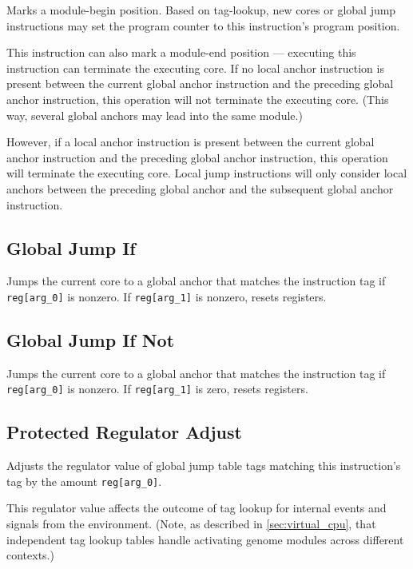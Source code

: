 
Marks a module-begin position.
Based on tag-lookup, new cores or global jump instructions may set the program counter to this instruction's program position.

This instruction can also mark a module-end position --- executing this instruction can terminate the executing core.
If no local anchor instruction is present between the current global anchor instruction and the preceding global anchor instruction, this operation will not terminate the executing core.
(This way, several global anchors may lead into the same module.)

However, if a local anchor instruction is present between the current global anchor instruction and the preceding global anchor instruction, this operation will terminate the executing core. 
Local jump instructions will only consider local anchors between the preceding global anchor and the subsequent global anchor instruction.

\subsection{Global Jump If}


Jumps the current core to a global anchor that matches the instruction tag if \texttt{reg[arg\_0]} is nonzero.
If \texttt{reg[arg\_1]} is nonzero, resets registers.

\subsection{Global Jump If Not}


Jumps the current core to a global anchor that matches the instruction tag if \texttt{reg[arg\_0]} is nonzero.
If \texttt{reg[arg\_1]} is zero, resets registers.

\subsection{Protected Regulator Adjust}


Adjusts the regulator value of global jump table tags matching this instruction's tag by the amount \texttt{reg[arg\_0]}.

This regulator value affects the outcome of tag lookup for internal events and signals from the environment.
(Note, as described in \ref{sec:virtual_cpu}, that independent tag lookup tables handle activating genome modules across different contexts.)

